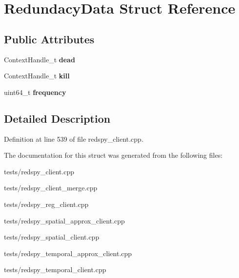 \hypertarget{structRedundacyData}{\section{Redundacy\-Data Struct Reference}
\label{structRedundacyData}
}
\subsection*{Public Attributes}
\begin{DoxyCompactItemize}
\item 
\hypertarget{structRedundacyData_ae351fd9051e1ce9103edc0a442f640cd}{Context\-Handle\-\_\-t {\bfseries dead}}\label{structRedundacyData_ae351fd9051e1ce9103edc0a442f640cd}

\item 
\hypertarget{structRedundacyData_a3e679a4a421c38e26ec0273e7d81a319}{Context\-Handle\-\_\-t {\bfseries kill}}\label{structRedundacyData_a3e679a4a421c38e26ec0273e7d81a319}

\item 
\hypertarget{structRedundacyData_a362533bc9aa189d3b36dfbad7cdb9c82}{uint64\-\_\-t {\bfseries frequency}}\label{structRedundacyData_a362533bc9aa189d3b36dfbad7cdb9c82}

\end{DoxyCompactItemize}


\subsection{Detailed Description}


Definition at line 539 of file redspy\-\_\-client.\-cpp.



The documentation for this struct was generated from the following files\-:\begin{DoxyCompactItemize}
\item 
tests/redspy\-\_\-client.\-cpp\item 
tests/redspy\-\_\-client\-\_\-merge.\-cpp\item 
tests/redspy\-\_\-reg\-\_\-client.\-cpp\item 
tests/redspy\-\_\-spatial\-\_\-approx\-\_\-client.\-cpp\item 
tests/redspy\-\_\-spatial\-\_\-client.\-cpp\item 
tests/redspy\-\_\-temporal\-\_\-approx\-\_\-client.\-cpp\item 
tests/redspy\-\_\-temporal\-\_\-client.\-cpp\end{DoxyCompactItemize}
